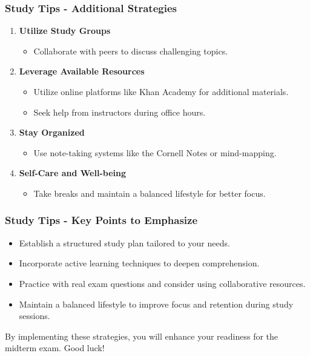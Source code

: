 \documentclass[aspectratio=169]{beamer}
\begin{document}
\begin{frame}[fragile]
    \frametitle{Study Tips - Additional Strategies}
    \begin{enumerate}[resume]
        \item \textbf{Utilize Study Groups}
            \begin{itemize}
                \item Collaborate with peers to discuss challenging topics.
            \end{itemize}
        \item \textbf{Leverage Available Resources}
            \begin{itemize}
                \item Utilize online platforms like Khan Academy for additional materials.
                \item Seek help from instructors during office hours.
            \end{itemize}
        \item \textbf{Stay Organized}
            \begin{itemize}
                \item Use note-taking systems like the Cornell Notes or mind-mapping.
            \end{itemize}
        \item \textbf{Self-Care and Well-being}
            \begin{itemize}
                \item Take breaks and maintain a balanced lifestyle for better focus.
            \end{itemize}
    \end{enumerate}
\end{frame}

\begin{frame}[fragile]
    \frametitle{Study Tips - Key Points to Emphasize}
    \begin{itemize}
        \item Establish a structured study plan tailored to your needs.
        \item Incorporate active learning techniques to deepen comprehension.
        \item Practice with real exam questions and consider using collaborative resources.
        \item Maintain a balanced lifestyle to improve focus and retention during study sessions.
    \end{itemize}
    By implementing these strategies, you will enhance your readiness for the midterm exam. Good luck!
\end{frame}
\end{document}

